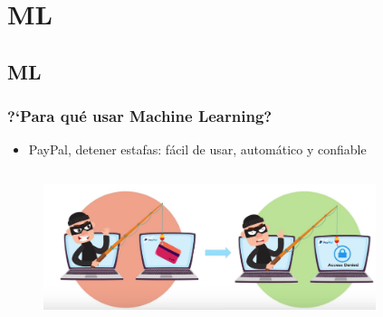 \documentclass[10pt]{beamer}
\begin{document}
\section{ML}
\subsection{ML}

\begin{frame}
\end{frame}



\begin{frame}
\frametitle{?`Para qu\'e usar Machine Learning?}

\begin{beamerboxesrounded}[upper=uppercolor, lower=lowercolor, shadow=true]{} 

\begin{itemize}
 \item PayPal, detener estafas: f\'acil de usar, autom\'atico y confiable

\end{itemize}
\end{beamerboxesrounded}

\begin{columns}

\hspace{5mm}
\hspace{5mm}
\begin{column}{\textwidth}
 \begin{figure}
 \includegraphics[scale=0.35]{./Figures/paypal.png} 
 \end{figure}
\end{column}%

\begin{column}{.33\textwidth}
 \begin{figure}
 \end{figure}  
\end{column}%

\end{columns}

\end{frame}
\end{document}
